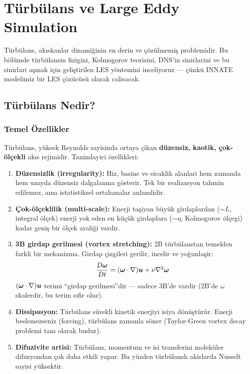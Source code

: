 \chapter{Türbülans ve Large Eddy Simulation}
\label{ch:turbulans_les}

Türbülans, ak\i{}skanlar dinamiğinin en derin ve çözülmemiş problemidir.
Bu bölümde türbülansin fizigini, Kolmogorov teorisini, DNS'in sinirlarini ve bu sinirlari aşmak için geliştirilen LES yöntemini inceliyoruz --- çünkü INNATE modelimiz bir LES çözücüsü olarak calisacak.


\section{Türbülans Nedir?}
\label{sec:turbulans_nedir}

\subsection{Temel Özellikler}

Türbülans, yüksek Reynolds sayisinda ortaya çikan \textbf{düzensiz, kaotik, çok-ölçekli} ak\i{}s rejimidir. Tanimlayici özellikleri:

\begin{enumerate}
\item \textbf{Düzensizlik (irregularity):} Hiz, basinc ve sicaklik alanlari hem zamanda hem uzayda düzensiz dalgalanma gösterir. Tek bir realizasyon tahmin edilemez, ama istatistiksel ortalamalar anlamlidir.

\item \textbf{Çok-ölçeklilik (multi-scale):} Enerji taşiyan büyük girdaplardan ($\sim L$, integral ölçek) enerji yok eden en küçük girdaplara ($\sim \eta$, Kolmogorov ölçegi) kadar geniş bir ölçek araliği vardir.

\item \textbf{3B girdap gerilmesi (vortex stretching):} 2B türbülanstan temelden farkli bir mekanizma. Girdap çizgileri gerilir, incelir ve yoğunlaşir:
\begin{equation}
\frac{D \bm{\omega}}{Dt} = (\bm{\omega}\cdot\nabla)\bm{u} + \nu\nabla^2\bm{\omega}
\label{eq:vorticity_eq}
\end{equation}
$(\bm{\omega}\cdot\nabla)\bm{u}$ terimi ``girdap gerilmesi''dir --- sadece 3B'de vardir (2B'de $\omega$ skalerdir, bu terim s\i{}fir olur).

\item \textbf{Dissipasyon:} Türbülans sürekli kinetik enerjiyi isiya dönüştürür. Enerji beslemezseniz (forcing), türbülans zamanla söner (Taylor-Green vortex decay problemi tam olarak budur).

\item \textbf{Difuzivite artisi:} Türbülans, momentum ve isi transferini moleküler difuzyondan çok daha etkili yapar. Bu yüzden türbülansl\i{} akislarda Nusselt sayisi yüksektir.
\end{enumerate}

